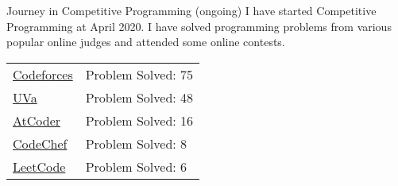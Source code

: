 \documentclass{article}
\newlength{\tabin}
\newlength{\secsep}
\newcommand{\lineunder}{\vspace*{-8pt} \\ \hspace*{-6pt} \hrulefill \\ \vspace*{-15pt}}
\newenvironment{tabbedsection}[1]{
  \begin{list}{}{
      \setlength{\itemsep}{0pt}
      \setlength{\labelsep}{0pt}
      \setlength{\labelwidth}{0pt}
      \setlength{\leftmargin}{\tabin}
      \setlength{\rightmargin}{\tabin}
      \setlength{\listparindent}{0pt}
      \setlength{\parsep}{0pt}
      \setlength{\parskip}{0pt}
      \setlength{\partopsep}{0pt}
      \setlength{\topsep}{#1}
    }
  \item[]
}{\end{list}}
\newenvironment{resume_section}[1]{
  \filbreak
  \vspace{2\secsep}
  \textsc{\large#1}
  \lineunder
  \begin{tabbedsection}{\secsep}
}{\end{tabbedsection}}
\begin{document}
  \begin{resume_section}{Journey in Competitive Programming (ongoing)}
    I have started Competitive Programming at April 2020. I have solved programming problems from various popular online judges and attended some online contests.
    
    \vspace{5px}
    \begin{tabularx}{\linewidth}{XX}
     \href{https://codeforces.com/profile/ehsan3p}{Codeforces} & Problem Solved: 75 \\ 
    \href{https://uhunt.onlinejudge.org/id/839904}{UVa} & Problem Solved: 48 \\
    \href{https://atcoder.jp/users/ehsan3p}{AtCoder} & Problem Solved: 16 \\
    \href{https://www.codechef.com/users/pappu3p}{CodeChef} & Problem Solved: 8 \\
    \href{https://leetcode.com/Ehsanul-Karim-Pappu/}{LeetCode} & Problem Solved: 6 \\
  
  \end{tabularx}
    
    
    
  \end{resume_section}




\end{document}
